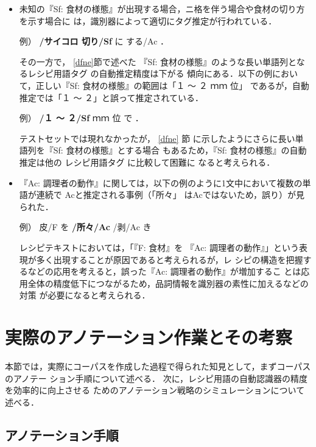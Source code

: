 \documentclass[japanese]{jnlp_1.4}
\begin{document}
\begin{itemize}
 \item 未知の『Sf: 食材の様態』が出現する場合，ニ格を伴う場合や食材の切り方を示す場合に
       は，識別器によって適切にタグ推定が行われている．

\quad \noindent 例） {\bf /サイコロ 切り/Sf} に する/Ac ．

       その一方で，
\ref{dfne}節で述べた
       『Sf: 食材の様態』のような長い単語列となるレシピ用語タグ
の自動推定精度は下がる
       傾向にある．以下の例において，正しい『Sf: 食材の様態』の範囲は「１ 〜 ２ ｍｍ 位」
       であるが，自動推定では「１ 〜 ２」と誤って推定されている．

\quad \noindent 例） {\bf /１ 〜 ２/Sf} ｍｍ 位 で ．

       テストセットでは現れなかったが，
\ref{dfne}
節
に示したようにさらに長い単語列を『Sf: 食材の様態』とする場合
       もあるため，『Sf: 食材の様態』の自動推定は他の
レシピ用語タグ
に比較して困難に
       なると考えられる．

 \item 『Ac: 調理者の動作』に関しては，以下の例のように1文中において複数の単語が連続で
       Acと推定される事例（「所々」
       はAcではないため，誤り）が見られた．

\quad \noindent 例） 皮/F を {\bf /所々/Ac} /剥/Ac き

レシピテキストにおいては，「『F: 食材』を
       『Ac: 調理者の動作』」という表現が多く出現することが原因であると考えられるが，レ
       シピの構造を把握するなどの応用を考えると，誤った『Ac: 調理者の動作』が増加するこ
       とは応用全体の精度低下につながるため，品詞情報を識別器の素性に加えるなどの対策
       が必要になると考えられる．
\end{itemize}


\section{実際のアノテーション作業とその考察}
\label{section_annotation}

本節では，実際にコーパスを作成した過程で得られた知見として，まずコーパスのアノテー
ション手順について述べる．
次に，レシピ用語の自動認識器の精度を効率的に向上させる
ためのアノテーション戦略のシミュレーションについて述べる．


\subsection{アノテーション手順}
\label{annotation_proc}
\end{document}

